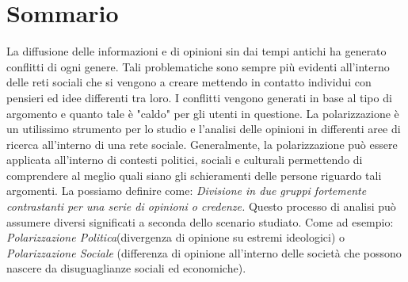 \newpage
\chapter*{Sommario}

\begin{spacing}{1.0}
La diffusione delle informazioni e di opinioni sin dai tempi antichi ha generato conflitti di ogni genere. Tali problematiche sono sempre più evidenti all'interno delle reti sociali che si vengono a creare mettendo in contatto individui con pensieri ed idee differenti tra loro. I conflitti vengono generati in base al tipo di argomento e quanto tale è "caldo" per gli utenti in questione. 
La polarizzazione è un utilissimo strumento per lo studio e l'analisi delle opinioni in differenti aree di ricerca all'interno di una rete sociale. Generalmente, la polarizzazione può essere applicata all'interno di contesti politici, sociali e culturali permettendo di comprendere al meglio quali siano  gli schieramenti delle persone riguardo tali argomenti. La possiamo definire come: \textit{Divisione in due gruppi fortemente contrastanti per una serie di opinioni o credenze.}
Questo processo di analisi può assumere diversi significati a seconda dello scenario studiato. Come ad esempio:
\textit{Polarizzazione Politica}(divergenza di opinione su estremi ideologici) o \textit{Polarizzazione Sociale} (differenza di opinione all'interno delle società che possono nascere da disuguaglianze sociali ed economiche).


\end{spacing}
